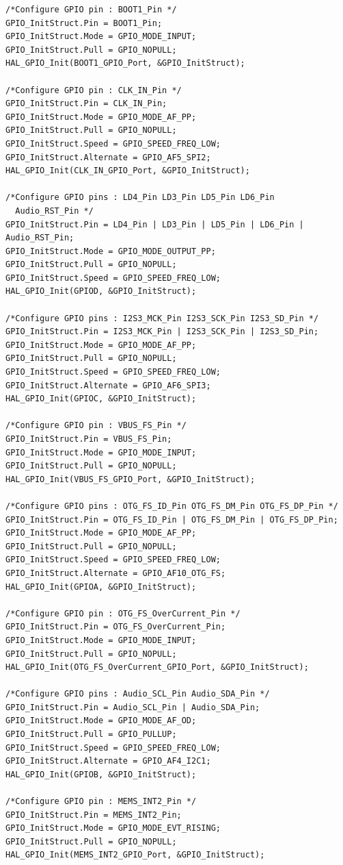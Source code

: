 \documentclass[12pt]{report}
\begin{document}
\begin{appendix}
\begin{lstlisting}[basicstyle=\scriptsize\ttfamily]
/*Configure GPIO pin : BOOT1_Pin */
GPIO_InitStruct.Pin = BOOT1_Pin;
GPIO_InitStruct.Mode = GPIO_MODE_INPUT;
GPIO_InitStruct.Pull = GPIO_NOPULL;
HAL_GPIO_Init(BOOT1_GPIO_Port, &GPIO_InitStruct);

/*Configure GPIO pin : CLK_IN_Pin */
GPIO_InitStruct.Pin = CLK_IN_Pin;
GPIO_InitStruct.Mode = GPIO_MODE_AF_PP;
GPIO_InitStruct.Pull = GPIO_NOPULL;
GPIO_InitStruct.Speed = GPIO_SPEED_FREQ_LOW;
GPIO_InitStruct.Alternate = GPIO_AF5_SPI2;
HAL_GPIO_Init(CLK_IN_GPIO_Port, &GPIO_InitStruct);

/*Configure GPIO pins : LD4_Pin LD3_Pin LD5_Pin LD6_Pin 
  Audio_RST_Pin */
GPIO_InitStruct.Pin = LD4_Pin | LD3_Pin | LD5_Pin | LD6_Pin | Audio_RST_Pin;
GPIO_InitStruct.Mode = GPIO_MODE_OUTPUT_PP;
GPIO_InitStruct.Pull = GPIO_NOPULL;
GPIO_InitStruct.Speed = GPIO_SPEED_FREQ_LOW;
HAL_GPIO_Init(GPIOD, &GPIO_InitStruct);

/*Configure GPIO pins : I2S3_MCK_Pin I2S3_SCK_Pin I2S3_SD_Pin */
GPIO_InitStruct.Pin = I2S3_MCK_Pin | I2S3_SCK_Pin | I2S3_SD_Pin;
GPIO_InitStruct.Mode = GPIO_MODE_AF_PP;
GPIO_InitStruct.Pull = GPIO_NOPULL;
GPIO_InitStruct.Speed = GPIO_SPEED_FREQ_LOW;
GPIO_InitStruct.Alternate = GPIO_AF6_SPI3;
HAL_GPIO_Init(GPIOC, &GPIO_InitStruct);

/*Configure GPIO pin : VBUS_FS_Pin */
GPIO_InitStruct.Pin = VBUS_FS_Pin;
GPIO_InitStruct.Mode = GPIO_MODE_INPUT;
GPIO_InitStruct.Pull = GPIO_NOPULL;
HAL_GPIO_Init(VBUS_FS_GPIO_Port, &GPIO_InitStruct);

/*Configure GPIO pins : OTG_FS_ID_Pin OTG_FS_DM_Pin OTG_FS_DP_Pin */
GPIO_InitStruct.Pin = OTG_FS_ID_Pin | OTG_FS_DM_Pin | OTG_FS_DP_Pin;
GPIO_InitStruct.Mode = GPIO_MODE_AF_PP;
GPIO_InitStruct.Pull = GPIO_NOPULL;
GPIO_InitStruct.Speed = GPIO_SPEED_FREQ_LOW;
GPIO_InitStruct.Alternate = GPIO_AF10_OTG_FS;
HAL_GPIO_Init(GPIOA, &GPIO_InitStruct);

/*Configure GPIO pin : OTG_FS_OverCurrent_Pin */
GPIO_InitStruct.Pin = OTG_FS_OverCurrent_Pin;
GPIO_InitStruct.Mode = GPIO_MODE_INPUT;
GPIO_InitStruct.Pull = GPIO_NOPULL;
HAL_GPIO_Init(OTG_FS_OverCurrent_GPIO_Port, &GPIO_InitStruct);

/*Configure GPIO pins : Audio_SCL_Pin Audio_SDA_Pin */
GPIO_InitStruct.Pin = Audio_SCL_Pin | Audio_SDA_Pin;
GPIO_InitStruct.Mode = GPIO_MODE_AF_OD;
GPIO_InitStruct.Pull = GPIO_PULLUP;
GPIO_InitStruct.Speed = GPIO_SPEED_FREQ_LOW;
GPIO_InitStruct.Alternate = GPIO_AF4_I2C1;
HAL_GPIO_Init(GPIOB, &GPIO_InitStruct);

/*Configure GPIO pin : MEMS_INT2_Pin */
GPIO_InitStruct.Pin = MEMS_INT2_Pin;
GPIO_InitStruct.Mode = GPIO_MODE_EVT_RISING;
GPIO_InitStruct.Pull = GPIO_NOPULL;
HAL_GPIO_Init(MEMS_INT2_GPIO_Port, &GPIO_InitStruct);


\end{lstlisting}
\end{appendix}
\end{document}
